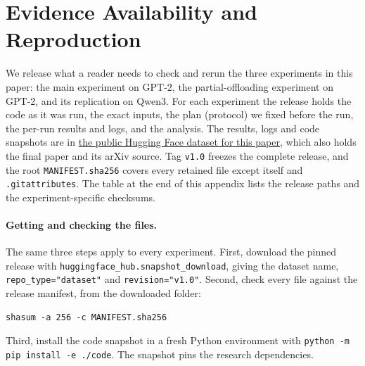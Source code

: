 \documentclass[11pt]{article}
\newcommand{\dataseturl}{https://huggingface.co/datasets/Setloop/What-Gradients-Add-to-Text-Leakage-in-Split-Language-Models-Counted-per-Token-and-per-Document}
\begin{document}
\appendix
\sloppy
\section{Evidence Availability and Reproduction}
\label{app:evidence}
We release what a reader needs to check and rerun the three experiments in this paper: the main experiment on GPT-2, the partial-offloading experiment on GPT-2, and its replication on Qwen3. For each experiment the release holds the code as it was run, the exact inputs, the plan (protocol) we fixed before the run, the per-run results and logs, and the analysis. The results, logs and code snapshots are in \href{\dataseturl}{the public Hugging Face dataset for this paper}, which also holds the final paper and its arXiv source. Tag \texttt{v1.0} freezes the complete release, and the root \nolinkurl{MANIFEST.sha256} covers every retained file except itself and \nolinkurl{.gitattributes}. The table at the end of this appendix lists the release paths and the experiment-specific checksums.

\paragraph{Getting and checking the files.}
The same three steps apply to every experiment. First, download the pinned release with \texttt{huggingface\_hub.snapshot\_download}, giving the dataset name, \texttt{repo\_type="dataset"} and \texttt{revision="v1.0"}. Second, check every file against the release manifest, from the downloaded folder:
\begin{verbatim}
shasum -a 256 -c MANIFEST.sha256
\end{verbatim}
Third, install the code snapshot in a fresh Python environment with \texttt{python -m pip install -e ./code}. The snapshot pins the research dependencies.
\end{document}
